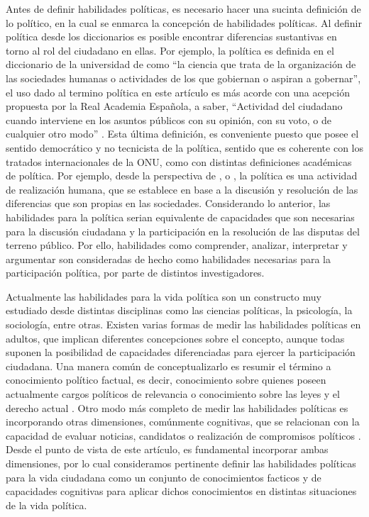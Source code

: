 \documentclass[12pt,twoside]{templates/facsothesis}
\begin{document}
Antes de definir habilidades políticas, es necesario hacer una sucinta definición de lo político, en la cual se enmarca la concepción de habilidades políticas. Al definir política desde los diccionarios es posible encontrar diferencias sustantivas en torno al rol del ciudadano en ellas. Por ejemplo, la política es definida en el diccionario de la universidad de \citet{oxford_Politica_2020} como ``la ciencia que trata de la organización de las sociedades humanas o actividades de los que gobiernan o aspiran a gobernar'', el uso dado al termino política en este artículo es más acorde con una acepción propuesta por la Real Academia Española, a saber, ``Actividad del ciudadano cuando interviene en los asuntos públicos con su opinión, con su voto, o de cualquier otro modo'' \citep{rae_politico_2014}. Esta última definición, es conveniente puesto que posee el sentido democrático y no tecnicista de la política, sentido que es coherente con los tratados internacionales de la ONU, como con distintas definiciones académicas de política. Por ejemplo, desde la perspectiva de \citet{arendt_Que_2009}, \citet{lechner_conflictiva_1984} o \citet{mouffe_retorno_1999}, la política es una actividad de realización humana, que se establece en base a la discusión y resolución de las diferencias que son propias en las sociedades. Considerando lo anterior, las habilidades para la política serian equivalente de capacidades que son necesarias para la discusión ciudadana y la participación en la resolución de las disputas del terreno público. Por ello, habilidades como comprender, analizar, interpretar y argumentar son consideradas de hecho como habilidades necesarias para la participación política, por parte de distintos investigadores.

Actualmente las habilidades para la vida política son un constructo muy estudiado desde distintas disciplinas como las ciencias políticas, la psicología, la sociología, entre otras. Existen varias formas de medir las habilidades políticas en adultos, que implican diferentes concepciones sobre el concepto, aunque todas suponen la posibilidad de capacidades diferenciadas para ejercer la participación ciudadana. Una manera común de conceptualizarlo es resumir el término a conocimiento político factual, es decir, conocimiento sobre quienes poseen actualmente cargos políticos de relevancia o conocimiento sobre las leyes y el derecho actual \citep{petricevic_Why_2020, vanerkel_Why_2020}. Otro modo más completo de medir las habilidades políticas es incorporando otras dimensiones, comúnmente cognitivas, que se relacionan con la capacidad de evaluar noticias, candidatos o realización de compromisos políticos \citep{mondak_Citizen_2020, duval_Citizens_2018}. Desde el punto de vista de este artículo, es fundamental incorporar ambas dimensiones, por lo cual consideramos pertinente definir las habilidades políticas para la vida ciudadana como un conjunto de conocimientos facticos y de capacidades cognitivas para aplicar dichos conocimientos en distintas situaciones de la vida política.
\end{document}
